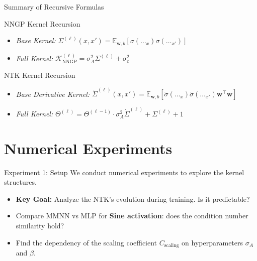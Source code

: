 \documentclass{beamer}
\begin{document}
\begin{frame}[fragile]{Summary of Recursive Formulas}
\begin{block}{NNGP Kernel Recursion}
\begin{itemize}
    \item \textit{Base Kernel:} $\Sigma^{(\ell)}(x, x') = \mathbb{E}_{\bm{w}, b} \left[ \sigma(\dots_x) \sigma(\dots_{x'}) \right]$
    \item \textit{Full Kernel:} $\mathcal{K}_{\text{NNGP}}^{(\ell)} = \sigma_A^2 \Sigma^{(\ell)} + \sigma_c^2$
\end{itemize}
\end{block}
\begin{block}{NTK Kernel Recursion}
\begin{itemize}
    \item \textit{Base Derivative Kernel:} $\dot{\Sigma}^{(\ell)}(x, x') = \mathbb{E}_{\bm{w}, b} \left[ \dot{\sigma}(\dots_x) \dot{\sigma}(\dots_{x'}) \bm{w}^\top\bm{w} \right]$
    \item \textit{Full Kernel:} $\Theta^{(\ell)} = \Theta^{(\ell-1)} \cdot \sigma_A^2 \dot{\Sigma}^{(\ell)} + {\Sigma}^{(\ell)}+1$
\end{itemize}
\end{block}
\end{frame}

\section{Numerical Experiments}

\begin{frame}{Experiment 1: Setup}
We conduct numerical experiments to explore the kernel structures.
\begin{itemize}
    \item \textbf{Key Goal:} Analyze the NTK's evolution during training. Is it predictable?
    \item Compare MMNN vs MLP for \textbf{Sine activation}: does the condition number similarity hold?
    \item Find the dependency of the scaling coefficient $C_{\text{scaling}}$ on hyperparameters $\sigma_A$ and $\beta$.
\end{itemize}
\end{frame}
\end{document}
